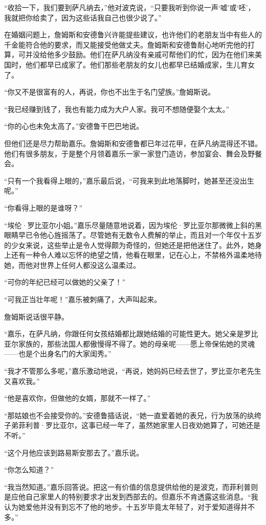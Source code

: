 \par “收拾一下，我们要到萨凡纳去，”他对波克说，“只要我听到你说一声‘嘘’或‘呸’，我就把你给卖了，因为这些话我自己也很少说了。”
\par 在婚姻问题上，詹姆斯和安德鲁兴许能提些建议，也许他们的老朋友当中有些人的千金能符合他的要求，而又能接受他做丈夫。詹姆斯和安德鲁耐心地听完他的打算，可并没给他多少鼓励。他们在萨凡纳没有亲戚可帮他们的忙，因为在他们来美国时，他们都早已成家了。他们那些老朋友的女儿也都早已结婚成家，生儿育女了。
\par “你又不是很富有的人，再说，你也不出生于名门望族。”詹姆斯说。
\par “我已经赚到钱了，我也有能力成为大户人家。我可不想随便娶个太太。”
\par “你的心也未免太高了。”安德鲁干巴巴地说。
\par 但他们还是尽力帮助嘉乐。詹姆斯和安德鲁都已年过花甲，在萨凡纳混得还不错。他们有很多朋友，于是整个月领着嘉乐一家一家登门造访，参加宴会、舞会及野餐会。
\par “只有一个我看得上眼的，”嘉乐最后说，“可我来到此地落脚时，她甚至还没出生呢。”
\par “你看得上眼的是谁呀？”
\par “埃伦·罗比亚尔小姐。”嘉乐尽量随意地说着，因为埃伦·罗比亚尔那微微上斜的黑眼睛早已令他心旌摇荡了。尽管她有无数令人费解的举止，而且对一个年仅十五岁的少女来说，这些举止是令人觉得颇为奇怪的，但她还是把他迷住了。此外，她身上还有一种令人难以忘怀的绝望之情，他看在眼里，记在心上，不禁格外温柔地待她，而他对世界上任何人都没这么温柔过。
\par “可你的年纪已经可以做她的父亲了！”
\par “可我正当壮年呢！”嘉乐被刺痛了，大声叫起来。
\par 詹姆斯说话很平静。
\par “嘉乐，在萨凡纳，你跟任何女孩结婚都比跟她结婚的可能性更大。她父亲是罗比亚尔家族的，那些法国人都傲慢得不得了。她的母亲呢——愿上帝保佑她的灵魂——也是个出身名门的大家闺秀。”
\par “我才不管那么多呢，”嘉乐激动地说，“再说，她妈妈已经去世了，罗比亚尔老先生又喜欢我。”
\par “他是喜欢你，但做他的女婿，那就不一样了。”
\par “那姑娘也不会接受你的。”安德鲁插话说，“她一直爱着她的表兄，行为放荡的纨绔子弟菲利普·罗比亚尔，这事已经一年了，虽然她家里人日夜劝她算了，可她还是不听。”
\par “这个月他应该到路易斯安那去了。”嘉乐说。
\par “你怎么知道？”
\par “我当然知道。”嘉乐回答说。把这一有价值的信息提供给他的是波克，而菲利普则是应他自己家里人的特别要求才出发到西部去的。但嘉乐不肯透露这些消息。“我认为她爱他并没有到忘不了他的地步。十五岁毕竟太年轻了，对于爱知道得并不多。”
